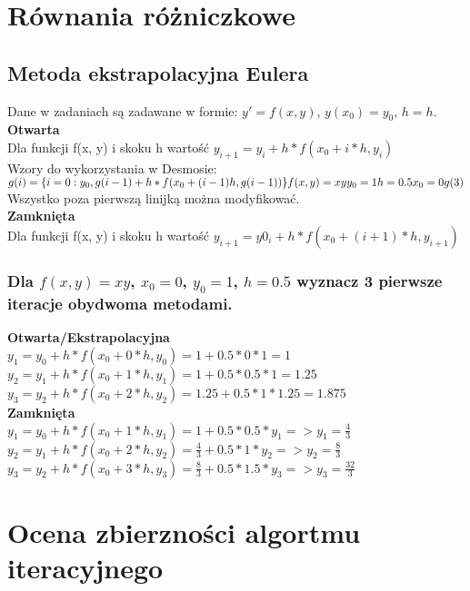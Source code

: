 \documentclass{article}
\begin{document}
\section{Równania różniczkowe}
\subsection{Metoda ekstrapolacyjna Eulera}
Dane w zadaniach są zadawane w formie: $y'=f(x, y)$, $y(x_0)=y_0$, $h=h$.\\
\textbf{Otwarta}\\
Dla funkcji f(x, y) i skoku h wartość $y_{i+1}=y_i+h*f(x_0+i*h, y_i)$\\
Wzory do wykorzystania w Desmosie:\\
$
g(i)=\{i=0:y_0,g(i-1)+h*f(x_0+(i-1)h, g(i-1))\}\\
f(x,y)=xy\\
y_0=1\\
h=0.5\\
x_0=0\\
g(3)\\
$\\
Wszystko poza pierwszą linijką można modyfikować.\\
\textbf{Zamknięta}\\
Dla funkcji f(x, y) i skoku h wartość $y_{i+1}=y0_i+h*f(x_0+(i+1)*h, y_{i+1})$\\

\subsubsection{Dla $f(x,y)=xy$, $x_0=0$, $y_0=1$, $h=0.5$ wyznacz 3 pierwsze iteracje obydwoma metodami.}
\textbf{Otwarta/Ekstrapolacyjna}\\
$y_1=y_0+h*f(x_0+0*h, y_0)=1+0.5*0*1=1$\\
$y_2=y_1+h*f(x_0+1*h, y_1)=1+0.5*0.5*1=1.25$\\
$y_3=y_2+h*f(x_0+2*h, y_2)=1.25+0.5*1*1.25=1.875$\\
\textbf{Zamknięta}\\
$y_1=y_0+h*f(x_0+1*h, y_1)=1+0.5*0.5*y_1 => y_1=\frac{4}{3}$\\
$y_2=y_1+h*f(x_0+2*h, y_2)=\frac{4}{3}+0.5*1*y_2 => y_2=\frac{8}{3}$\\
$y_3=y_2+h*f(x_0+3*h, y_3)=\frac{8}{3}+0.5*1.5*y_3 => y_3=\frac{32}{3}$\\

\section{Ocena zbierzności algortmu iteracyjnego}
\end{document}
